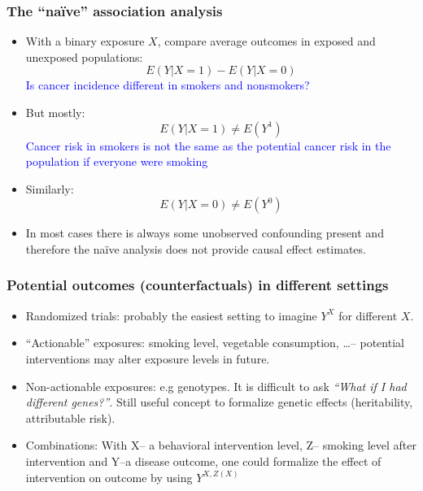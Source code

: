 \documentclass[10pt,dvipsnames,t,handout%
,aspectratio=169%
]{beamer}%
\begin{document}
\begin{frame}
	\frametitle{The ``na\"ive'' association analysis}
	{\small  \begin{itemize}
			\item With a binary exposure $X$, compare average outcomes in exposed and unexposed populations:
			\[E(Y|X=1) - E(Y|X=0)\]
			\textcolor{blue}{Is cancer incidence different in smokers and nonsmokers?}
			\item But mostly:
			\[E(Y|X=1) \ne E(Y^1)\]
			\textcolor{blue}{Cancer risk in smokers is not the same as the potential cancer risk in the population if everyone were smoking}
			\item Similarly:
			\[E(Y|X=0) \ne E(Y^0)\]
			\item In most cases there is always some \alert{unobserved confounding} present and therefore the
			na\"ive analysis does not provide causal effect estimates.  
	\end{itemize}}
\end{frame}




\begin{frame}
	\frametitle{Potential outcomes (counterfactuals) in different settings}
	\begin{itemize}
		\item \alert<1>{Randomized trials}: probably the easiest setting to imagine $Y^X$ for different $X$. \\[0.3cm]
		\item \alert<2>{``Actionable'' exposures}: smoking level, vegetable consumption, \ldots -- potential interventions may alter exposure levels in future.\\[0.3cm]
		\item \alert<3>{Non-actionable exposures}: e.g genotypes. It is difficult to ask \emph{``What if I had different genes?''}. Still useful concept to formalize genetic effects (heritability, attributable risk). \\[0.3cm]
		\item \alert<4>{Combinations}: With X-- a behavioral intervention level, Z-- smoking level after intervention and Y--a disease outcome, one could formalize the effect of intervention on outcome by using $Y^{X, Z(X)}$
	\end{itemize}
\end{frame}
\end{document}
